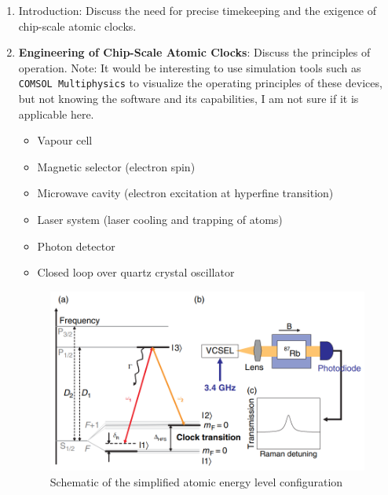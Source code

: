 \begin{enumerate}
    \item Introduction: Discuss the need for precise timekeeping and the exigence of chip-scale atomic clocks.
    \item \textbf{Engineering of Chip-Scale Atomic Clocks}: Discuss the principles of operation. Note: It would be interesting to use simulation tools such as \texttt{COMSOL Multiphysics} to visualize the operating principles of these devices, but not knowing the software and its capabilities, I am not sure if it is applicable here.
          \begin{itemize}
              \item Vapour cell
              \item Magnetic selector (electron spin)
              \item Microwave cavity (electron excitation at hyperfine transition)
              \item Laser system (laser cooling and trapping of atoms)
              \item Photon detector
              \item Closed loop over quartz crystal oscillator
          \end{itemize}
          \begin{figure}[H]
              \centering
              \includegraphics[width=.6\textwidth]{img/atomic_clock_logic.png}
              \caption{Schematic of the simplified atomic energy level configuration \cite{KNAPPE2008571}}
          \end{figure}


\end{enumerate}
